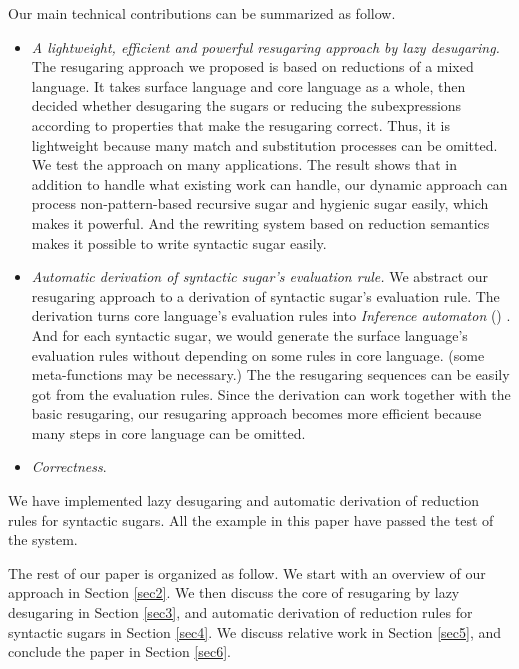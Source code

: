 Our main technical contributions can be summarized as follow. 
\begin{itemize}
\item {\em A lightweight, efficient and powerful resugaring approach by lazy desugaring.} The resugaring approach we proposed is based on reductions of a mixed language. It takes surface language and core language as a whole, then decided whether desugaring the sugars or reducing the subexpressions according to properties that make the resugaring correct. Thus, it is lightweight because many match and substitution processes can be omitted. We test the  approach on many applications. The result shows that in addition to handle what existing work can handle, our dynamic approach can process non-pattern-based recursive sugar and hygienic sugar easily, which makes it powerful. And the rewriting system based on reduction semantics makes it possible to write syntactic sugar easily.
\item {\em Automatic derivation of syntactic sugar's evaluation rule.} We abstract our resugaring approach to a derivation of syntactic sugar's evaluation rule. The derivation turns core language's evaluation rules into \emph{Inference automaton} () . And for each syntactic sugar, we would generate the surface language's evaluation rules without depending on some rules in core language. (some meta-functions may be necessary.)  The the resugaring sequences can be easily got from the evaluation rules. Since the derivation can work together with the basic resugaring, our resugaring approach becomes more efficient because many steps in core language can be omitted.
\item {\em Correctness}.
\end{itemize}

We have implemented lazy desugaring and automatic derivation of reduction rules for syntactic sugars. All the example in this paper have passed the test of the system.

The rest of our paper is organized as follow. We start with an overview of our approach in Section \ref{sec2}. We then discuss the core of resugaring by lazy desugaring in Section \ref{sec3}, and automatic derivation of reduction rules for syntactic sugars in Section \ref{sec4}. We discuss relative work in Section \ref{sec5}, and conclude the paper in Section \ref{sec6}.
